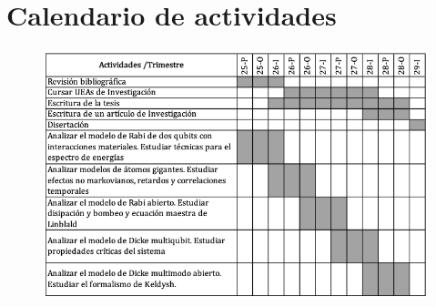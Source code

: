 \documentclass[onecolumn,notitlepage,letterpaper,aps,pra,12pt]{article}
\numberwithin{equation}{section}
\begin{document}
\printbibliography[heading=none]


\section{Calendario de actividades}

\begin{figure}[H]
    \centering
    \includegraphics[width=1\linewidth]{Images/Calendario.png}
    \label{Calendario}
\end{figure}
\end{document}
